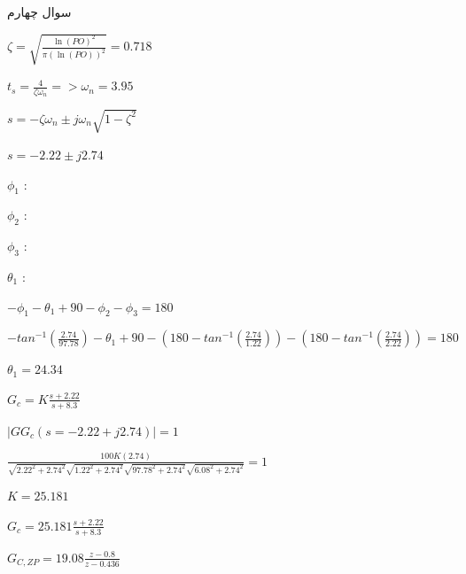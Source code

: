 \documentclass[12pt]{article}
\begin{document}
    \begin{problem}{سوال چهارم}
    	\raggedleft
    	
    	
    	
    	$\zeta = \sqrt{\frac{\ln(PO)^2}{\pi(\ln(PO))^2}} = 0.718$
    	
    	$t_s = \frac{4}{\zeta \omega_n} => \omega_n = 3.95  $
    	
    	$s = -\zeta\omega_n \pm j\omega_n\sqrt{1-\zeta^2}$
    	
    	$s = -2.22 \pm j2.74$
    	
    	
    	
    	
    	\raggedleft
    	
    	
    	$\phi_1$ : 
    	
    	$\phi_2$ : 
    	
    	$\phi_3$ : 
    	
    	$\theta_1$ : 
    	
    	
    	\raggedleft
    	$-\phi_1 - \theta_1 + 90 - \phi_2 - \phi_3 = 180$
    	
    	$-tan^{-1}(\frac{2.74}{97.78}) - \theta_1 + 90 - (180 - tan^{-1}(\frac{2.74}{1.22})) - (180 - tan^{-1}(\frac{2.74}{2.22})) = 180$
    	
    	$\theta_1 = 24.34$
    	
    	$G_c = K \frac{s+2.22}{s+8.3}$
    	
    	$|GG_c(s = -2.22+j2.74)| = 1$
    	
    	$\frac{100K(2.74)}{\sqrt{2.22^2+2.74^2} \sqrt{1.22^2+2.74^2} \sqrt{97.78^2 + 2.74^2} \sqrt{6.08^2 + 2.74^2}} = 1$
    	
    	$K = 25.181$
    	
    	$G_c = 25.181\frac{s+2.22}{s+8.3}$
    	
    	
    	$G_{C,ZP} =19.08 \frac{z - 0.8}{z-0.436}$
    	
    	 
    	
    	
    \end{problem}
    \centering
\end{document}

